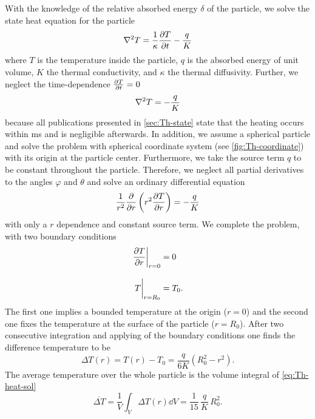With the knowledge of the relative absorbed energy $\delta$ of the particle, we 
solve the state heat equation for the particle
\begin{equation}
  \laplacian{T} = \frac{1}{\kappa} \pdv{T}{t} - \frac{q}{K}
  \label{eq:Th-heat-prob}
\end{equation}
where $T$ is the temperature inside the particle, $q$ is the absorbed energy of 
unit volume, $K$ the thermal conductivity, and $\kappa$ the thermal 
diffusivity. Further, we neglect the time-dependence $\pdv{T}{t}= 0$
\begin{equation}
  \laplacian{T} = - \frac{q}{K}
  \label{eq:Th-heat-stat}
\end{equation}
because all publications presented in \cref{sec:Th-state} state that the 
heating occurs within \si{\ms} and is negligible afterwards. In addition, we 
assume a spherical particle and solve the problem with spherical coordinate 
system (see \cref{fig:Th-coordinate}) with its origin at the particle center. 
Furthermore, we take the source term $q$ to be constant throughout the 
particle. Therefore, we neglect all partial derivatives to the angles $\varphi$ 
and $\theta$ and solve an ordinary differential equation
\begin{equation}
    \frac{1}{r^{2}}\pdv{r}\left( r^{2}\pdv{T}{r} \right) = - \frac{q}{K}
  \label{eq:Th-heat-spherical}
\end{equation}
with only a $r$ dependence and constant source term. We complete the problem, 
with two boundary conditions
\begin{subequations}
\begin{align}
  \eval{\pdv{T}{r}}_{r=0} &= 0\\[3mm]
  \eval{T}_{r=R_{0}} &= T_{0}.
\end{align}
\end{subequations}
The first one implies a bounded temperature at the origin ($r=0$) and the 
second one fixes the temperature at the surface of the particle ($r=R_{0}$). 
After two consecutive integration and applying of the boundary conditions one 
finds the difference temperature to be
\begin{equation}
  \Delta T(r) = T(r) - T_{0} = \frac{q}{6K}\left( R_0^2 - r^{2} \right).
  \label{eq:Th-heat-sol}
\end{equation}
The average temperature over the whole particle is the volume integral of 
\cref{eq:Th-heat-sol}
\begin{equation}
  \overline{\Delta T} = \frac{1}{V}\int_{V}\Delta T(r) \dd{V} = 
  \frac{1}{15}\,\frac{q}{K}\,R^{2}_{0}.
  \label{eq:Th-heat-avg}
\end{equation}
